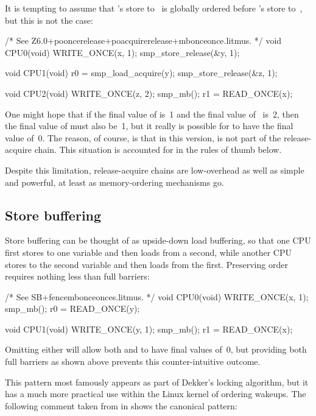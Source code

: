 It is tempting to assume that 's store to~ is globally ordered
before 's store to~, but this is not the case:

\begin{VerbatimU}
	/* See Z6.0+pooncerelease+poacquirerelease+mbonceonce.litmus. */
	void CPU0(void)
	{
		WRITE_ONCE(x, 1);
		smp_store_release(&y, 1);
	}

	void CPU1(void)
	{
		r0 = smp_load_acquire(y);
		smp_store_release(&z, 1);
	}

	void CPU2(void)
	{
		WRITE_ONCE(z, 2);
		smp_mb();
		r1 = READ_ONCE(x);
	}
\end{VerbatimU}

One might hope that if the final value of  is~1 and the final value
of~ is~2, then the final value of  must also be~1, but it
really is possible for  to have the final value of~0.
The reason, of course, is that in this version,  is not part
of the release-acquire chain.
This situation is accounted for in the rules of thumb below.

Despite this limitation, release-acquire chains are low-overhead as
well as simple and powerful, at least as memory-ordering mechanisms go.


\subsection{Store buffering}

Store buffering can be thought of as upside-down load buffering, so
that one CPU first stores to one variable and then loads from a second,
while another CPU stores to the second variable and then loads from the
first.
Preserving order requires nothing less than full barriers:

\begin{VerbatimU}
	/* See SB+fencembonceonces.litmus. */
	void CPU0(void)
	{
		WRITE_ONCE(x, 1);
		smp_mb();
		r0 = READ_ONCE(y);
	}

	void CPU1(void)
	{
		WRITE_ONCE(y, 1);
		smp_mb();
		r1 = READ_ONCE(x);
	}
\end{VerbatimU}

Omitting either  will allow both  and  to have final
values of~0, but providing both full barriers as shown above prevents
this counter-intuitive outcome.

This pattern most famously appears as part of Dekker's locking
algorithm, but it has a much more practical use within the Linux kernel
of ordering wakeups.
The following comment taken from  in
 shows the canonical pattern:

